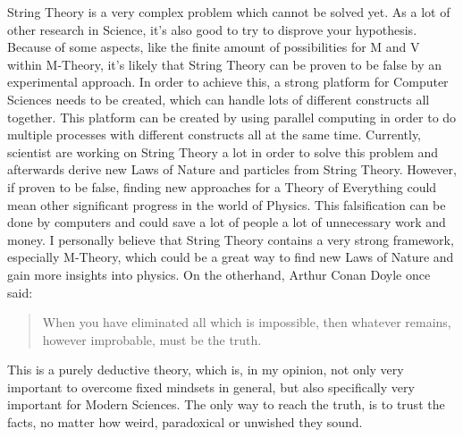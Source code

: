 \documentclass[../paper.tex]{subfiles}
\begin{document}
String Theory is a very complex problem which cannot be solved yet. As a lot of other research in Science, it's also good to try to disprove your hypothesis. Because of some aspects, like the finite amount of possibilities for M and V within M-Theory, it's likely that String Theory can be proven to be false by an experimental approach. In order to achieve this, a strong platform for Computer Sciences needs to be created, which can handle lots of different constructs all together. This platform can be created by using parallel computing in order to do multiple processes with different constructs all at the same time. Currently, scientist are working on String Theory a lot in order to solve this problem and afterwards derive new Laws of Nature and particles from String Theory. However, if proven to be false, finding new approaches for a Theory of Everything could mean other significant progress in the world of Physics. This falsification can be done by computers and could save a lot of people a lot of unnecessary work and money. I personally believe that String Theory contains a very strong framework, especially M-Theory, which could be a great way to find new Laws of Nature and gain more insights into physics. On the otherhand, Arthur Conan Doyle once said:
\begin{quote}
    When you have eliminated all which is impossible, then whatever remains, however improbable, must be the truth.
    \author{Arthur Conan Doyle}
    \label{Deduction}
\end{quote}
This is a purely deductive theory, which is, in my opinion, not only very important to overcome fixed mindsets in general, but also specifically very important for Modern Sciences. The only way to reach the truth, is to trust the facts, no matter how weird, paradoxical or unwished they sound. 
\end{document}
